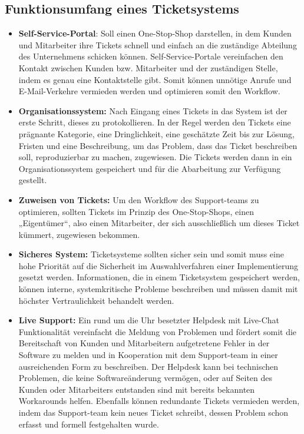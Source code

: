   \subsection{Funktionsumfang eines Ticketsystems}
  
  \begin{itemize}
	  \item 	\textbf{Self-Service-Portal}: Soll einen One-Stop-Shop darstellen, in dem Kunden und Mitarbeiter ihre Tickets schnell und einfach an die zuständige Abteilung des Unternehmens schicken können. Self-Service-Portale vereinfachen den Kontakt zwischen Kunden bzw. Mitarbeiter und der zuständigen Stelle, indem es genau eine Kontaktstelle gibt. Somit können unnötige Anrufe und E-Mail-Verkehre vermieden werden und optimieren somit den Workflow.  \\
	  \item \textbf{	Organisationssystem:} Nach Eingang eines Tickets in das System ist der erste Schritt, dieses zu protokollieren. In der Regel werden den Tickets eine prägnante Kategorie, eine Dringlichkeit, eine geschätzte Zeit bis zur Lösung, Fristen und eine Beschreibung, um das Problem, dass das Ticket beschreiben soll, reproduzierbar zu machen, zugewiesen. Die Tickets werden dann in ein Organisationssystem gespeichert und für die Abarbeitung zur Verfügung gestellt.  \\
	  \item \textbf{Zuweisen von Tickets:} Um den Workflow des Support-teams zu optimieren, sollten Tickets im Prinzip des One-Stop-Shops, einen „Eigentümer“, also einen Mitarbeiter, der sich ausschließlich um dieses Ticket kümmert, zugewiesen bekommen.  \\
	  \item \textbf{	Sicheres System:} Ticketsysteme sollten sicher sein und somit muss eine hohe Priorität auf die Sicherheit im Auswahlverfahren einer Implementierung gesetzt werden. Informationen, die in einem Ticketsystem gespeichert werden, können interne, systemkritische Probleme beschreiben und müssen damit mit höchster Vertraulichkeit behandelt werden. \\
	  \item \textbf{Live Support:} Ein rund um die Uhr besetzter Helpdesk mit Live-Chat Funktionalität vereinfacht die Meldung von Problemen und fördert somit die Bereitschaft von Kunden und Mitarbeitern aufgetretene Fehler in der Software zu melden und in Kooperation mit dem Support-team in einer ausreichenden Form zu beschreiben. Der Helpdesk kann bei technischen Problemen, die keine Softwareänderung vermögen, oder auf Seiten des Kunden oder Mitarbeiters entstanden sind mit bereits bekannten Workarounds helfen. Ebenfalls können redundante Tickets vermieden werden, indem das Support-team kein neues Ticket schreibt, dessen Problem schon erfasst und formell festgehalten wurde. \\
  \end{itemize}
  
